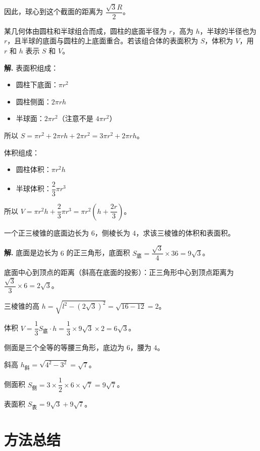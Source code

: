 \documentclass[11pt]{ctexrep}
\begin{document}
因此，球心到这个截面的距离为 $\dfrac{\sqrt{3}R}{2}$。

\begin{example}[组合体的体积]
    某几何体由圆柱和半球组合而成，圆柱的底面半径为 $r$，高为 $h$，半球的半径也为 $r$，且半球的底面与圆柱的上底面重合。若该组合体的表面积为 $S$，体积为 $V$，用 $r$ 和 $h$ 表示 $S$ 和 $V$。
\end{example}

\textbf{解.} 表面积组成：
\begin{itemize}
    \item 圆柱下底面：$\pi r^2$
    \item 圆柱侧面：$2\pi rh$
    \item 半球面：$2\pi r^2$（注意不是 $4\pi r^2$）
\end{itemize}

所以 $S = \pi r^2 + 2\pi rh + 2\pi r^2 = 3\pi r^2 + 2\pi rh$。

体积组成：
\begin{itemize}
    \item 圆柱体积：$\pi r^2 h$
    \item 半球体积：$\dfrac{2}{3}\pi r^3$
\end{itemize}

所以 $V = \pi r^2 h + \dfrac{2}{3}\pi r^3 = \pi r^2\left(h + \dfrac{2r}{3}\right)$。

\begin{example}[练习]
    一个正三棱锥的底面边长为 $6$，侧棱长为 $4$，求该三棱锥的体积和表面积。
\end{example}

\textbf{解.} 底面是边长为 $6$ 的正三角形，底面积 $S_{\text{底}} = \dfrac{\sqrt{3}}{4} \times 36 = 9\sqrt{3}$。

底面中心到顶点的距离（斜高在底面的投影）：正三角形中心到顶点距离为 $\dfrac{\sqrt{3}}{3} \times 6 = 2\sqrt{3}$。

三棱锥的高 $h = \sqrt{l^2 - (2\sqrt{3})^2} = \sqrt{16 - 12} = 2$。

体积 $V = \dfrac{1}{3}S_{\text{底}} \cdot h = \dfrac{1}{3} \times 9\sqrt{3} \times 2 = 6\sqrt{3}$。

侧面是三个全等的等腰三角形，底边为 $6$，腰为 $4$。

斜高 $h_{\text{斜}} = \sqrt{4^2 - 3^2} = \sqrt{7}$。

侧面积 $S_{\text{侧}} = 3 \times \dfrac{1}{2} \times 6 \times \sqrt{7} = 9\sqrt{7}$。

表面积 $S_{\text{表}} = 9\sqrt{3} + 9\sqrt{7}$。

\section*{方法总结}
\end{document}
